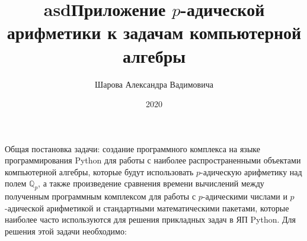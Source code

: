 \documentclass[master, och, times, assignment]{sty/SCWorks}
\begin{document}
\title{asd}
\title{Приложение $p$-адической арифметики к задачам компьютерной алгебры}
\author{Шарова Александра Вадимовича}







\date{2020}

\maketitle

Общая постановка задачи: создание программного комплекса на языке программирования Python для работы с наиболее распространенными объектами компьютерной алгебры, которые будут использовать $p$-адическую арифметику над полем $\mathbb{Q}_p$, а также произведение сравнения времени вычислений между полученным программным комплексом для работы с $p$-адическими числами и $p$-адической арифметикой и стандартными математическими пакетами, которые наиболее часто используются для решения прикладных задач в ЯП Python. Для решения этой задачи необходимо:
\end{document}
